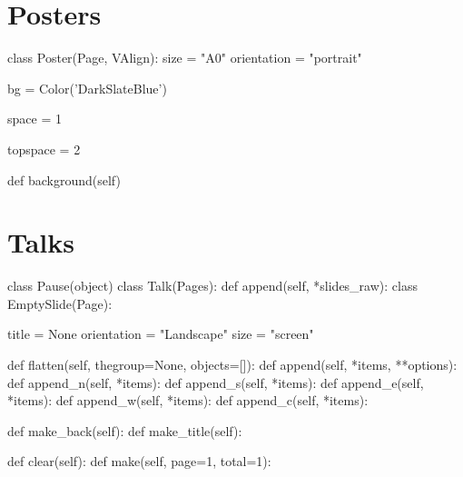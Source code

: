 \section{Posters}

\begin{python}
class Poster(Page, VAlign):
    size = "A0"
    orientation = "portrait"

    bg = Color('DarkSlateBlue')

    space = 1

    topspace = 2
	
    def background(self)
\end{python}


\section{Talks}


\begin{python}
class Pause(object)
class Talk(Pages):
    def append(self, *slides_raw):
class EmptySlide(Page):

    title = None
    orientation = "Landscape"
    size = "screen"

    def flatten(self, thegroup=None, objects=[]):
    def append(self, *items, **options):
    def append_n(self, *items):
    def append_s(self, *items):
    def append_e(self, *items):
    def append_w(self, *items):
    def append_c(self, *items):

    def make_back(self):
    def make_title(self):

	def clear(self):
    def make(self, page=1, total=1):
\end{python}




